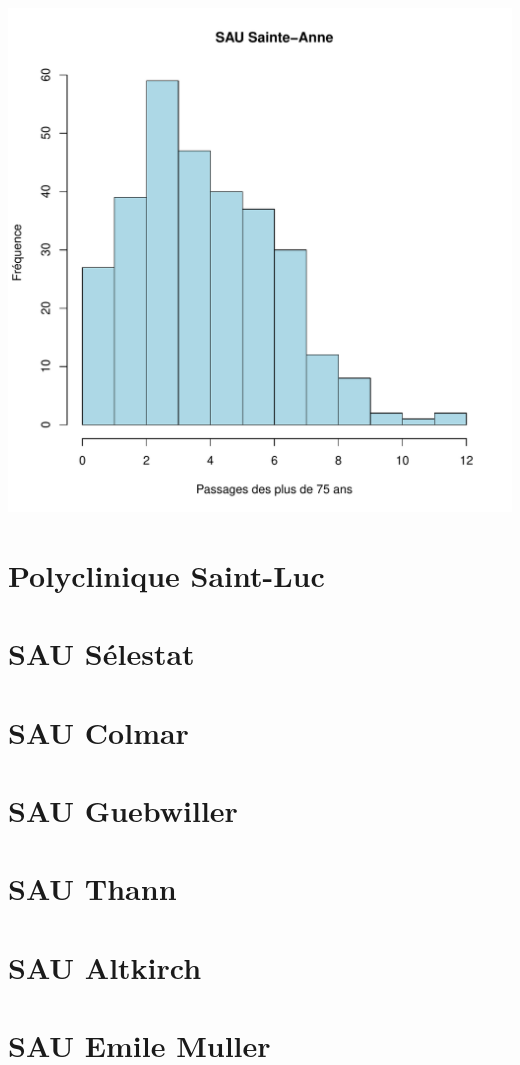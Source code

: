 \documentclass[12pt,english,french,twoside]{report}\usepackage[]{graphicx}\usepackage[]{color}
\makeatletter
\def\maxwidth{ %
  \ifdim\Gin@nat@width>\linewidth
    \linewidth
  \else
    \Gin@nat@width
  \fi
}
\newenvironment{knitrout}{}{} %
\makeatother
\begin{document}
\begin{knitrout}
\includegraphics[width=\maxwidth]{figure/stAnne_sup75_passages2} 

\end{knitrout}



\chapter{Polyclinique Saint-Luc}
\chapter{SAU Sélestat}
\chapter{SAU Colmar}
\chapter{SAU Guebwiller}
\chapter{SAU Thann}
\chapter{SAU Altkirch}
\chapter{SAU Emile Muller}
\end{document}
